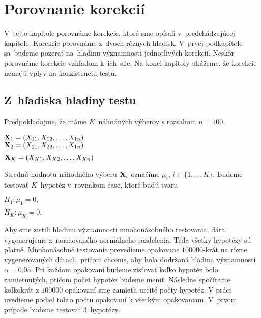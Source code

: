 \chapter{Porovnanie korekcií}

V~tejto kapitole porovnáme korekcie, ktoré sme opísali v~predchádzajúcej kapitole. 
Korekcie porovnáme z~dvoch rôznych hladísk. 
V~prvej podkapitole sa~budeme pozerať na~hladinu významnosti jednotlivých korekcií. 
Neskôr porovnáme korekcie vzhľadom k~ich~sile. 
Na konci kapitoly ukážeme, že korekcie nemajú vplyv na konzistenciu testu. 

\section{Z~hľadiska hladiny testu}

Predpokladajme, že máme $K$~náhodných výberov s rozsahom $n=100$. 
\begin{center} 
    $ {\bf X}_1 = (X_{11}, X_{12}, \dots, X_{1n}) $ \\
    $ {\bf X}_2 = (X_{21}, X_{22}, \dots, X_{1n}) $ \\
    $\vdots$ \\
    $ {\bf X}_K = (X_{K1}, X_{K2}, \dots, X_{Kn}) $ \\
\end{center}
Strednú hodnotu náhodného výberu ${\bf X}_i$ označíme $\mu_i$, $i \in \{ 1, \dots, K\}$. 
Budeme testovať $K$~hypotéz v~rovnakom čase, ktoré budú tvaru 
\begin{center} 
$ H_1: \mu_1 = 0, $ \\
$ \vdots $ \\
$ H_K: \mu_K = 0. $ \\
\end{center}
Aby sme zistili hladinu významnosti mnohonásobného testovania, 
dáta vygenerujeme z~normovaného normálneho rozdelenia. 
Teda všetky hypotézy sú platné. 
Mnohonásobné testovanie prevedieme opakovane $100000$-krát na rôzne vygenerovaných dátach, 
pričom chceme, aby bola dodržaná hladina významnosti $\alpha=0.05$. 
Pri každom opakovaní budeme zisťovať koľko hypotéz bolo zamietnutých, 
pričom počet hypotéz budeme meniť. 
Následne spočítame koľkokrát z $100000$ opakovaní sme zamietli určité počty hypotéz. 
V práci uvedieme podiel tohto počtu opakovaní k všetkým opakovaniam. 
V~prvom prípade budeme testovať $3$~hypotézy. 

